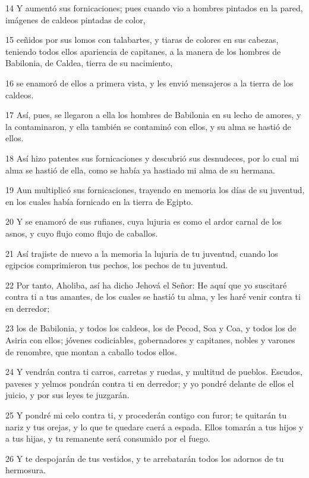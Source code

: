 \par 14 Y aumentó sus fornicaciones; pues cuando vio a hombres pintados en la pared, imágenes de caldeos pintadas de color,
\par 15 ceñidos por sus lomos con talabartes, y tiaras de colores en sus cabezas, teniendo todos ellos apariencia de capitanes, a la manera de los hombres de Babilonia, de Caldea, tierra de su nacimiento,
\par 16 se enamoró de ellos a primera vista, y les envió mensajeros a la tierra de los caldeos.
\par 17 Así, pues, se llegaron a ella los hombres de Babilonia en su lecho de amores, y la contaminaron, y ella también se contaminó con ellos, y su alma se hastió de ellos.
\par 18 Así hizo patentes sus fornicaciones y descubrió sus desnudeces, por lo cual mi alma se hastió de ella, como se había ya hastiado mi alma de su hermana.
\par 19 Aun multiplicó sus fornicaciones, trayendo en memoria los días de su juventud, en los cuales había fornicado en la tierra de Egipto.
\par 20 Y se enamoró de sus rufianes, cuya lujuria es como el ardor carnal de los asnos, y cuyo flujo como flujo de caballos.
\par 21 Así trajiste de nuevo a la memoria la lujuria de tu juventud, cuando los egipcios comprimieron tus pechos, los pechos de tu juventud.
\par 22 Por tanto, Aholiba, así ha dicho Jehová el Señor: He aquí que yo suscitaré contra ti a tus amantes, de los cuales se hastió tu alma, y les haré venir contra ti en derredor;
\par 23 los de Babilonia, y todos los caldeos, los de Pecod, Soa y Coa, y todos los de Asiria con ellos; jóvenes codiciables, gobernadores y capitanes, nobles y varones de renombre, que montan a caballo todos ellos.
\par 24 Y vendrán contra ti carros, carretas y ruedas, y multitud de pueblos. Escudos, paveses y yelmos pondrán contra ti en derredor; y yo pondré delante de ellos el juicio, y por sus leyes te juzgarán.
\par 25 Y pondré mi celo contra ti, y procederán contigo con furor; te quitarán tu nariz y tus orejas, y lo que te quedare caerá a espada. Ellos tomarán a tus hijos y a tus hijas, y tu remanente será consumido por el fuego.
\par 26 Y te despojarán de tus vestidos, y te arrebatarán todos los adornos de tu hermosura.
